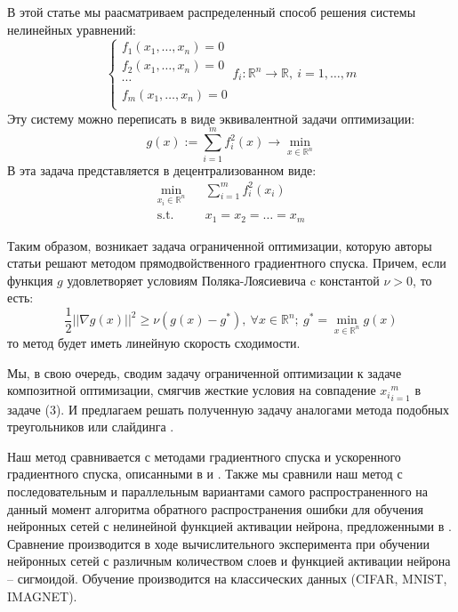 \documentclass[12pt, twoside]{article}
\newcommand{\alexanderb}[1]{\todo[inline]{{\textbf{Alexander B.:} \emph{#1}}}}
\begin{document}
В этой статье мы раасматриваем распределенный способ решения системы нелинейных уравнений: 
\begin{equation}
    \label{1}
    \begin{cases}
    f_1(x_1,\ldots,x_n) = 0\\
    f_2(x_1,\ldots,x_n) = 0\\
    \cdots\\
    f_m(x_1,\ldots,x_n) = 0\\
    \end{cases}
    f_i:\mathbb{R}^n \rightarrow \mathbb{R},\ i = 1, \ldots, m
\end{equation}
Эту систему можно переписать в виде эквивалентной задачи оптимизации:
\begin{equation}
    \label{2}
    g(x) := \sum\limits_{i = 1}^m f^2_i(x) \rightarrow \min\limits_{x \in \mathbb{R}^n}
\end{equation}
В \cite{Karimi1} эта задача представляется в децентрализованном виде:
\begin{eqnarray}
    \label{3}
    \min\limits_{x_i \in \mathbb{R}^n} &&\sum\limits_{i = 1}^m f^2_i(x_i) \nonumber\\
    \text{s.t.} &&x_1 = x_2 = \ldots = x_m
\end{eqnarray}

 Таким образом, возникает задача ограниченной оптимизации, которую авторы статьи решают методом прямодвойственного градиентного спуска. Причем, если функция $g$ удовлетворяет условиям Поляка-Лоясиевича c константой $\nu > 0$, то есть:
\begin{equation}
    \label{4}
    \dfrac{1}{2}||\nabla g(x)||^2 \geq \nu(g(x) - g^*),\ \forall x \in \mathbb{R}^n;\ g^* = \min\limits_{x \in \mathbb{R}^n}g(x)
\end{equation}
то метод будет иметь линейную скорость сходимости.

Мы, в свою очередь, сводим задачу ограниченной оптимизации к задаче композитной оптимизации, смягчив жесткие условия на совпадение ${x_i}_{i=1}^m$ в задаче (3). И предлагаем решать полученную задачу аналогами метода подобных треугольников или слайдинга \cite{Gasnikov2}.

Наш метод сравнивается с методами градиентного спуска и ускоренного градиентного спуска, описанными в \cite{Karimi2} и \cite{Gasnikov1}. Также мы сравнили наш метод с последовательным и параллельным вариантами самого распространенного на данный момент алгоритма обратного распространения ошибки для обучения нейронных сетей с нелинейной функцией активации нейрона, предложенными в \cite{Prafulla}. Сравнение производится в ходе вычислительного эксперимента при обучении нейронных сетей с различным количеством слоев и функцией активации нейрона -- сигмоидой. Обучение производится на классических данных (CIFAR, MNIST, IMAGNET).
\end{document}
